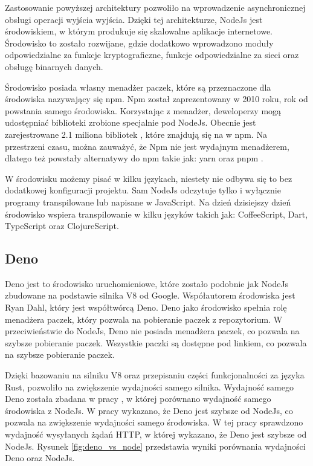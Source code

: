 Zastosowanie powyższej architektury pozwoliło na wprowadzenie asynchronicznej obsługi operacji wyjścia wyjścia. Dzięki tej architekturze, NodeJs jest środowiskiem, w którym produkuje się skalowalne aplikacje internetowe. Środowisko to zostało rozwijane, gdzie dodatkowo wprowadzono moduły odpowiedzialne za funkcje kryptograficzne, funkcje odpowiedzialne za sieci oraz obsługę binarnych danych.

Środowisko posiada własny menadżer paczek, które są przeznaczone dla środowiska nazywający się npm. Npm został zaprezentowany w 2010 roku, rok od powstania samego środowiska. Korzystając z menadżer, deweloperzy mogą udostępniać biblioteki zrobione specjalnie pod NodeJs. Obecnie jest zarejestrowane 2.1 miliona bibliotek \cite{npm}, które znajdują się na w npm. Na przestrzeni czasu, można zauważyć, że Npm nie jest wydajnym menadżerem, dlatego też powstały alternatywy do npm takie jak: yarn \cite{yarn} oraz pnpm \cite{pnpm}. 

W środowisku możemy pisać w kilku językach, niestety nie odbywa się to bez dodatkowej konfiguracji projektu. Sam NodeJs odczytuje tylko i wyłącznie programy transpilowane lub napisane w JavaScript. Na dzień dzisiejszy dzień środowisko wspiera transpilowanie w kilku języków takich jak: CoffeeScript, Dart, TypeScript oraz ClojureScript.

\subsection{Deno}
Deno jest to środowisko uruchomieniowe, które zostało podobnie jak NodeJs zbudowane na podstawie silnika V8 od Google. Współautorem środowiska jest Ryan Dahl, który jest współtwórcą Deno. Deno jako środowisko spełnia rolę menadżera paczek, który pozwala na pobieranie paczek z repozytorium. W przeciwieństwie do NodeJs, Deno nie posiada menadżera paczek, co pozwala na szybsze pobieranie paczek. Wszystkie paczki są dostępne pod linkiem, co pozwala na szybsze pobieranie paczek.

Dzięki bazowaniu na silniku V8 oraz przepisaniu części funkcjonalności za języka Rust, pozwoliło na zwiększenie wydajności samego silnika. Wydajność samego Deno została zbadana w pracy \cite{deno_performance}, w której porównano wydajność samego środowiska z NodeJs. W pracy wykazano, że Deno jest szybsze od NodeJs, co pozwala na zwiększenie wydajności samego środowiska. W tej pracy sprawdzono wydajność wysyłanych żądań HTTP, w której wykazano, że Deno jest szybsze od NodeJs. Rysunek \ref{fig:deno_vs_node} przedstawia wyniki porównania wydajności Deno oraz NodeJs.

